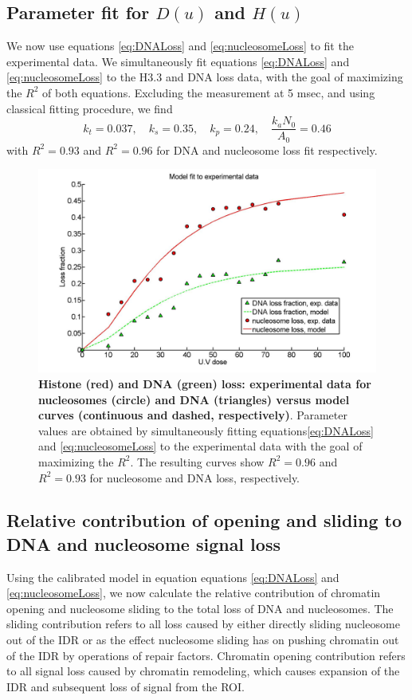 \documentclass[12pt]{article}
\begin{document}
	\subsection{Parameter fit for $D(u)$ and $H(u)$}\label{subsection:parameterFit}
	We now use equations \eqref{eq:DNALoss}  and \eqref{eq:nucleosomeLoss} to fit the experimental data. We simultaneously fit equations \eqref{eq:DNALoss}  and \eqref{eq:nucleosomeLoss} to the H3.3 and DNA loss data, with the goal of maximizing the $R^2$ of both equations. Excluding the measurement at 5 msec, and using classical fitting procedure, we find
	\begin{equation*}
	k_t = 0.037, \quad k_s = 0.35,\quad k_p = 0.24, \quad \frac{k_aN_0}{A_0} = 0.46
	\end{equation*}
	with $R^2 = 0.93$ and $R^2 = 0.96$ for DNA and nucleosome loss fit respectively.
	
	
\begin{figure}[H]
\centering
\includegraphics[width=0.5\linewidth, height=0.3\textheight]{histoneAndDnaVsUvDoseModelFit}
\caption{\textbf{Histone (red) and DNA (green) loss: experimental data
	for nucleosomes (circle) and DNA (triangles) versus model curves
	(continuous and dashed, respectively)}. Parameter values are obtained
	by simultaneously fitting equations\eqref{eq:DNALoss}  and \eqref{eq:nucleosomeLoss} to the experimental data with
	the goal of maximizing the $R^2$. The resulting curves show $R^2 = 0.96$ and
	$R^2 = 0.93$ for nucleosome and DNA loss, respectively.}
\label{fig:histoneAndDnaVsUvDoseModelFit}
\end{figure}

\subsection{Relative contribution of opening and sliding to DNA
	and nucleosome signal loss}

Using the calibrated model in equation equations \eqref{eq:DNALoss}  and \eqref{eq:nucleosomeLoss}, we now calculate the
relative contribution of chromatin opening and nucleosome sliding to the
total loss of DNA and nucleosomes. The sliding contribution refers to all loss
caused by either directly sliding nucleosome out of the IDR or as the effect
nucleosome sliding has on pushing chromatin out of the IDR by operations
of repair factors. Chromatin opening contribution refers to all signal loss
caused by chromatin remodeling, which causes expansion of the IDR and
subsequent loss of signal from the ROI.
\end{document}
